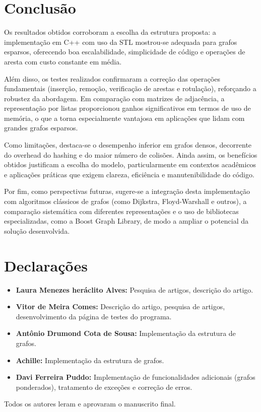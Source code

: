 \documentclass{sbc2023}%
\begin{document}
\section{Conclusão}

Os resultados obtidos corroboram a escolha da estrutura proposta: 
a implementação em C++ com uso da STL mostrou-se adequada para 
grafos esparsos, oferecendo boa escalabilidade, simplicidade de código 
e operações de aresta com custo constante em média.  

Além disso, os testes realizados confirmaram a correção das operações 
fundamentais (inserção, remoção, verificação de arestas e rotulação), 
reforçando a robustez da abordagem. Em comparação com matrizes de 
adjacência, a representação por listas proporcionou ganhos significativos 
em termos de uso de memória, o que a torna especialmente vantajosa em 
aplicações que lidam com grandes grafos esparsos.  

Como limitações, destaca-se o desempenho inferior em grafos densos, 
decorrente do overhead do hashing e do maior número de colisões. 
Ainda assim, os benefícios obtidos justificam a escolha do modelo, 
particularmente em contextos acadêmicos e aplicações práticas que 
exigem clareza, eficiência e manutenibilidade do código.  

Por fim, como perspectivas futuras, sugere-se a integração desta 
implementação com algoritmos clássicos de grafos (como Dijkstra, 
Floyd-Warshall e outros), a comparação sistemática com diferentes 
representações e o uso de bibliotecas especializadas, como a Boost Graph 
Library, de modo a ampliar o potencial da solução desenvolvida.
\section*{Declarações}

\begin{contributions}
\begin{itemize}
    \item \textbf{Laura Menezes heráclito Alves:} Pesquisa de artigos, descrição do artigo.
    \item \textbf{Vitor de Meira Comes:} Descrição do artigo, pesquisa de artigos, desenvolvimento da página de testes do programa.
    \item \textbf{Antônio Drumond Cota de Sousa:} Implementação da estrutura de grafos.
    \item \textbf{Achille:} Implementação da estrutura de grafos.
    \item \textbf{Davi Ferreira Puddo:} Implementação de funcionalidades adicionais (grafos ponderados), tratamento de exceções e correção de erros.
\end{itemize}
Todos os autores leram e aprovaram o manuscrito final.
\end{contributions}
\end{document}
